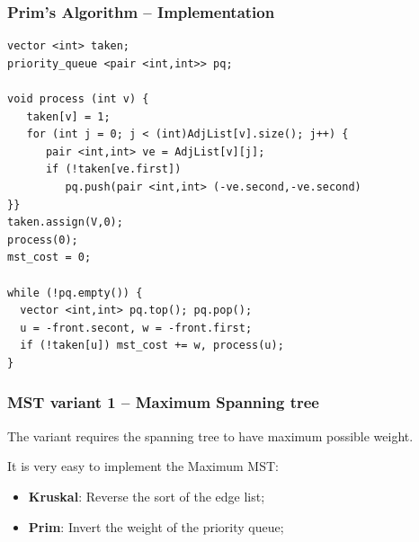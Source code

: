 \begin{frame}[fragile]
  \frametitle{Prim's Algorithm -- Implementation}
{\smaller
\begin{exampleblock}{}
\begin{verbatim}
vector <int> taken;
priority_queue <pair <int,int>> pq;

void process (int v) {
   taken[v] = 1;
   for (int j = 0; j < (int)AdjList[v].size(); j++) {
      pair <int,int> ve = AdjList[v][j];
      if (!taken[ve.first])
         pq.push(pair <int,int> (-ve.second,-ve.second)
}}
taken.assign(V,0);
process(0);
mst_cost = 0;

while (!pq.empty()) {
  vector <int,int> pq.top(); pq.pop();
  u = -front.secont, w = -front.first;
  if (!taken[u]) mst_cost += w, process(u);
}
\end{verbatim}
\end{exampleblock}
}
\end{frame}

\begin{frame}
  \frametitle{MST variant 1 -- Maximum Spanning tree}

    \begin{block}{}
      The  variant requires the spanning tree to have maximum possible weight.\bigskip


      It is very easy to implement the Maximum MST:
      \begin{itemize}
        \item {\bf Kruskal}: Reverse the sort of the edge list;
        \item {\bf Prim}: Invert the weight of the priority queue;
      \end{itemize}
    \end{block}

  \medskip

\end{frame}

